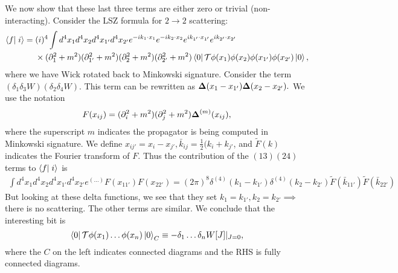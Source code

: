 We now show that these last three terms are either zero or trivial (non-interacting). Consider the LSZ formula for $2\to 2$ scattering:
\begin{align*}
    \braket{f}{i}={}&(i)^4 \int d^4 x_1 d^4 x_2 d^4x_{1'} d^4x_{2'} e^{-ik_1\cdot x_1} e^{-ik_2 \cdot x_2} e^{ik_{1'}\cdot x_{1'}} e^{ik_{2'} \cdot x_{2'}}\\
        &\times (\p_1^2 +m^2)(\p_{1'}^2+m^2)(\p_2^2+m^2)(\p_{2'}^2 +m^2)
        \bra{0}\mathcal{T} \phi(x_1)\phi(x_2)\phi(x_{1'})\phi(x_{2'})\ket{0},
\end{align*}
where we have Wick rotated back to Minkowski signature. Consider the term $(\delta_1\delta_3W)(\delta_2\delta_4W)$. This term can be rewritten as $\mbox{\boldmath$ \Delta $}(x_1-x_{1'})\mbox{\boldmath$ \Delta $}(x_2-x_{2'}).$ We use the notation 
\begin{equation*}
    F(x_{ij})=(\partial_i^2 +m^2)(\partial_j^2 +m^2)\mbox{\boldmath$ \Delta $}^{(m)}(x_{ij}),
\end{equation*} 
where the superscript $m$ indicates the propagator is being computed in Minkowski signature. We define $x_{ij'}=x_i-x_{j'}, \bar k_{ij}=\frac{1}{2}(k_i +k_{j'}$, and $\tilde F(k)$ indicates the Fourier transform of $F$. Thus the contribution of the $(13)(24)$ terms to $\braket{f}{i}$ is
\begin{align*}
    \int d^4 x_1 d^4 x_2 d^4x_{1'} d^4x_{2'} e^{(\ldots)} F(x_{11'}) F(x_{22'}) = (2\pi)^8 \delta^{(4)}(k_1 -k_{1'})\delta^{(4)} (k_2-k_{2'}) \tilde F (\bar k_{11'}) \tilde F(\bar k_{22'})
\end{align*}
But looking at these delta functions, we see that they set $k_1=k_{1'},k_2=k_{2'}\implies$ there is no scattering. The other terms are similar. We conclude that the interesting bit is
\begin{equation}
    \left< 0 \right|\mathcal{T}\phi(x_1)\ldots \phi(x_n) \left| 0 \right>_C \equiv -\delta_1 \ldots \delta_n W[J]|_{J=0},
\end{equation}
where the $C$ on the left indicates connected diagrams and the RHS is fully connected diagrams.